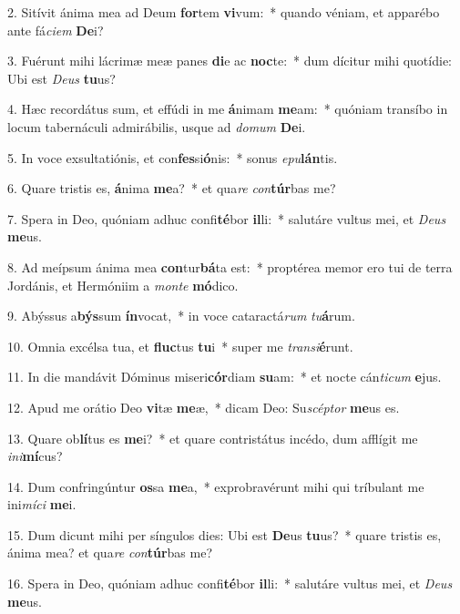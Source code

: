 2. Sitívit ánima mea ad Deum \textbf{for}tem \textbf{vi}vum:~*  quando véniam, et apparébo ante fá\textit{ci}\textit{em} \textbf{De}i?\

3. Fuérunt mihi lácrimæ meæ panes \textbf{di}e ac \textbf{noc}te:~*  dum dícitur mihi quotídie: Ubi est \textit{De}\textit{us} \textbf{tu}us?\

4. Hæc recordátus sum, et effúdi in me \textbf{á}nimam \textbf{me}am:~*  quóniam transíbo in locum tabernáculi admirábilis, usque ad \textit{do}\textit{mum} \textbf{De}i.\

5. In voce exsultatiónis, et con\textbf{fes}si\textbf{ó}nis:~*  sonus \textit{e}\textit{pu}\textbf{lán}tis.\

6. Quare tristis es, \textbf{á}nima \textbf{me}a?~*  et qua\textit{re} \textit{con}\textbf{túr}bas me?\

7. Spera in Deo, quóniam adhuc confi\textbf{té}bor \textbf{il}li:~*  salutáre vultus mei, et \textit{De}\textit{us} \textbf{me}us.\

8. Ad meípsum ánima mea \textbf{con}tur\textbf{bá}ta est:~*  proptérea memor ero tui de terra Jordánis, et Hermóniim a \textit{mon}\textit{te} \textbf{mó}dico.\

9. Abýssus a\textbf{býs}sum \textbf{ín}vocat,~*  in voce cataractá\textit{rum} \textit{tu}\textbf{á}rum.\

10. Omnia excélsa tua, et \textbf{fluc}tus \textbf{tu}i~*  super me \textit{trans}\textit{i}\textbf{é}runt.\

11. In die mandávit Dóminus miseri\textbf{cór}diam \textbf{su}am:~*  et nocte cán\textit{ti}\textit{cum} \textbf{e}jus.\

12. Apud me orátio Deo \textbf{vi}tæ \textbf{me}æ,~*  dicam Deo: Su\textit{scép}\textit{tor} \textbf{me}us es.\

13. Quare ob\textbf{lí}tus es \textbf{me}i?~*  et quare contristátus incédo, dum afflígit me \textit{in}\textit{i}\textbf{mí}cus?\

14. Dum confringúntur \textbf{os}sa \textbf{me}a,~*  exprobravérunt mihi qui tríbulant me ini\textit{mí}\textit{ci} \textbf{me}i.\

15. Dum dicunt mihi per síngulos dies: Ubi est \textbf{De}us \textbf{tu}us?~*  quare tristis es, ánima mea? et qua\textit{re} \textit{con}\textbf{túr}bas me?\

16. Spera in Deo, quóniam adhuc confi\textbf{té}bor \textbf{il}li:~*  salutáre vultus mei, et \textit{De}\textit{us} \textbf{me}us.\

